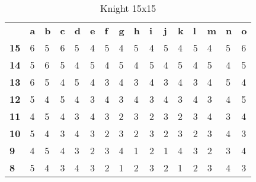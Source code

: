 \documentclass{article}
\begin{document}
\begin{table}[H]
\centering
\caption{Knight 15x15}
\label{my-label}
\begin{tabular}{llllllllllllllll}
                                 & \textbf{a} & \textbf{b} & \textbf{c} & \textbf{d} & \textbf{e} & \textbf{f} & \textbf{g} & \textbf{h} & \textbf{i} & \textbf{j} & \textbf{k} & \textbf{l} & \textbf{m} & \textbf{n} & \textbf{o} \\ \cline{2-16} 
\multicolumn{1}{l|}{\textbf{15}} & 6          & 5          & 6          & 5          & 4          & 5          & 4          & 5          & 4          & 5          & 4          & 5          & 4          & 5          & 6          \\
\multicolumn{1}{l|}{\textbf{14}} & 5          & 6          & 5          & 4          & 5          & 4          & 5          & 4          & 5          & 4          & 5          & 4          & 5          & 4          & 5          \\
\multicolumn{1}{l|}{\textbf{13}} & 6          & 5          & 4          & 5          & 4          & 3          & 4          & 3          & 4          & 3          & 4          & 3          & 4          & 5          & 4          \\
\multicolumn{1}{l|}{\textbf{12}} & 5          & 4          & 5          & 4          & 3          & 4          & 3          & 4          & 3          & 4          & 3          & 4          & 3          & 4          & 5          \\
\multicolumn{1}{l|}{\textbf{11}} & 4          & 5          & 4          & 3          & 4          & 3          & 2          & 3          & 2          & 3          & 2          & 3          & 4          & 3          & 4          \\
\multicolumn{1}{l|}{\textbf{10}} & 5          & 4          & 3          & 4          & 3          & 2          & 3          & 2          & 3          & 2          & 3          & 2          & 3          & 4          & 3          \\
\multicolumn{1}{l|}{\textbf{9}}  & 4          & 5          & 4          & 3          & 2          & 3          & 4          & 1          & 2          & 1          & 4          & 3          & 2          & 3          & 4          \\
\multicolumn{1}{l|}{\textbf{8}}  & 5          & 4          & 3          & 4          & 3          & 2          & 1          & 2          & 3          & 2          & 1          & 2          & 3          & 4          & 3          \\

\end{tabular}
\end{table}
\end{document}
